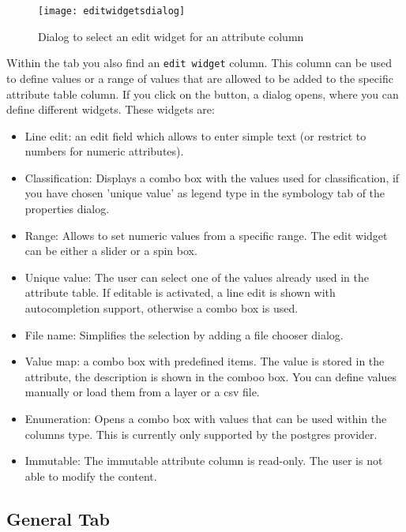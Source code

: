 
\begin{figure}[ht]
   \centering
   \texttt{[image: editwidgetsdialog]}
   \caption{Dialog to select an edit widget for an attribute column
\nixcaption}\label{fig:editwidget}
\end{figure}

Within the  tab you also find an \texttt{edit widget} column.
This column can be used to define values or a range of values that are
allowed
to be added to the specific attribute table column. If you click on the
 button, a dialog opens, where you can define different
widgets. These widgets are:

\begin{itemize}[label=--]
\item Line edit: an edit field which allows to enter simple text (or restrict
to
numbers for numeric attributes).
\item Classification: Displays a combo box with the values used for
classification, if you have chosen 'unique value' as legend type in the
symbology tab of the properties dialog.
\item Range: Allows to set numeric values from a specific range. The edit
widget can be either a slider or a spin box.
\item Unique value: The user can select one of the values already used in the
attribute table. If editable is activated, a line edit is shown with
autocompletion support, otherwise a combo box is used.
\item File name: Simplifies the selection by adding a file chooser dialog.
\item Value map: a combo box with predefined items. The value is stored in
the attribute, the description is shown in the comboo box. You can define
values manually or load them from a layer or a csv file.
\item Enumeration: Opens a combo box with values that can be used within the
columns type. This is currently only supported by the postgres provider.
\item Immutable: The immutable attribute column is read-only. The user is not
able to modify the content.
\end{itemize}

\subsection{General Tab}\label{vectorgeneraltab}

